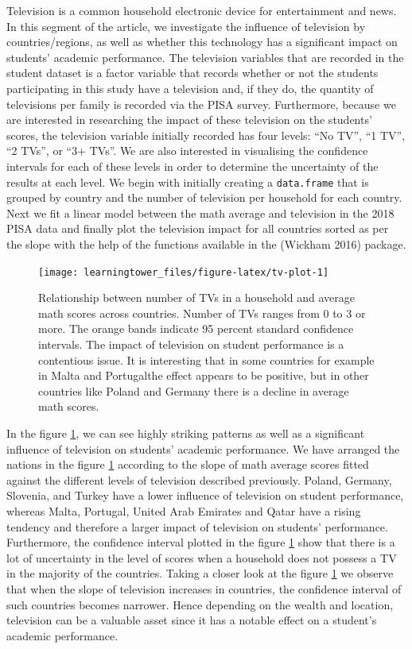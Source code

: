 Television is a common household electronic device for entertainment and news. In this segment of the article, we investigate the influence of television by countries/regions, as well as whether this technology has a significant impact on students' academic performance. The television variables that are recorded in the student dataset is a factor variable that records whether or not the students participating in this study have a television and, if they do, the quantity of televisions per family is recorded via the PISA survey. Furthermore, because we are interested in researching the impact of these television on the students' scores, the television variable initially recorded has four levels: ``No TV'', ``1 TV'', ``2 TVs'', or ``3+ TVs''. We are also interested in visualising the confidence intervals for each of these levels in order to determine the uncertainty of the results at each level. We begin with initially creating a \texttt{data.frame} that is grouped by country and the number of television per household for each country. Next we fit a linear model between the math average and television in the 2018 PISA data and finally plot the television impact for all countries sorted as per the slope with the help of the functions available in the  (Wickham 2016) package.

\begin{figure}[H]
\texttt{[image: learningtower\_files/figure-latex/tv-plot-1]} \caption{Relationship  between number of TVs in a household and average math scores across countries. Number of TVs ranges from 0 to 3 or more. The orange bands indicate 95 percent standard confidence intervals. The impact of television on student performance is a contentious issue. It is interesting that in some countries for example in Malta and Portugalthe effect appears to be positive, but in other countries like Poland and Germany there is a decline in average math scores.}\label{fig:tv-plot}
\end{figure}

In the figure \ref{fig:tv-plot}, we can see highly striking patterns as well as a significant influence of television on students' academic performance. We have arranged the nations in the figure \ref{fig:tv-plot} according to the slope of math average scores fitted against the different levels of television described previously. Poland, Germany, Slovenia, and Turkey have a lower influence of television on student performance, whereas Malta, Portugal, United Arab Emirates and Qatar have a rising tendency and therefore a larger impact of television on students' performance. Furthermore, the confidence interval plotted in the figure \ref{fig:tv-plot} show that there is a lot of uncertainty in the level of scores when a household does not possess a TV in the majority of the countries. Taking a closer look at the figure \ref{fig:tv-plot} we observe that when the slope of television increases in countries, the confidence interval of such countries becomes narrower. Hence depending on the wealth and location, television can be a valuable asset since it has a notable effect on a student's academic performance.

